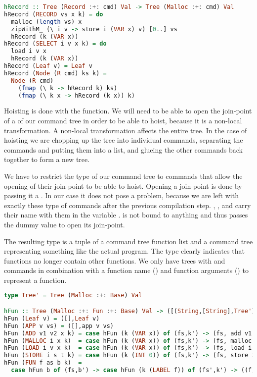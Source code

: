 \begin{lstlisting}[language=Haskell]
hRecord :: Tree (Record :+: cmd) Val -> Tree (Malloc :+: cmd) Val
hRecord (RECORD vs x k) = do
  malloc (length vs) x
  zipWithM_ (\ i v -> store i (VAR x) v) [0..] vs
  hRecord (k (VAR x))
hRecord (SELECT i v x k) = do
  load i v x
  hRecord (k (VAR x))
hRecord (Leaf v) = Leaf v
hRecord (Node (R cmd) ks k) =
  Node (R cmd)
    (fmap (\ k -> hRecord k) ks)
    (fmap (\ k x -> hRecord (k x)) k)
\end{lstlisting}

Hoisting is done with the  function. We will need to be able to open the join-point of a  of our command tree in order to be able to hoist, because it is a non-local transformation. A non-local transformation affects the entire tree. In the case of hoisting we are chopping up the tree into individual commands, separating the  commands and putting them into a list, and glueing the other commands back together to form a new tree.

We have to restrict the type of our command tree to commands that allow the opening of their join-point to be able to hoist. Opening a join-point is done by passing it a . In our case it does not pose a problem, because we are left with exactly these type of commands after the previous compilation step. , , and  carry their name with them in the variable .  is not bound to anything and thus passes the dummy value  to open its join-point.

The resulting type is a tuple of a command tree function list and a command tree representing something like the actual program. The type clearly indicates that functions no longer contain other functions. We only have trees with  and  commands in combination with a function name () and function arguments (\icode{[String]}) to represent a function.

\begin{lstlisting}[language=Haskell]
type Tree' = Tree (Malloc :+: Base) Val

hFun :: Tree (Malloc :+: Fun :+: Base) Val -> ([(String,[String],Tree')], Tree')
hFun (Leaf v) = ([],Leaf v)
hFun (APP v vs) = ([],app v vs)
hFun (ADD v1 v2 x k) = case hFun (k (VAR x)) of (fs,k') -> (fs, add v1 v2 x >> k')
hFun (MALLOC i x k)  = case hFun (k (VAR x)) of (fs,k') -> (fs, malloc i x >> k')
hFun (LOAD i v x k)  = case hFun (k (VAR x)) of (fs,k') -> (fs, load i v x >> k')
hFun (STORE i s t k) = case hFun (k (INT 0)) of (fs,k') -> (fs, store i s t >> k')
hFun (FUN f as b k)  =
  case hFun b of (fs,b') -> case hFun (k (LABEL f)) of (fs',k') -> ((f,as,b'):fs'++fs,k')
\end{lstlisting}

